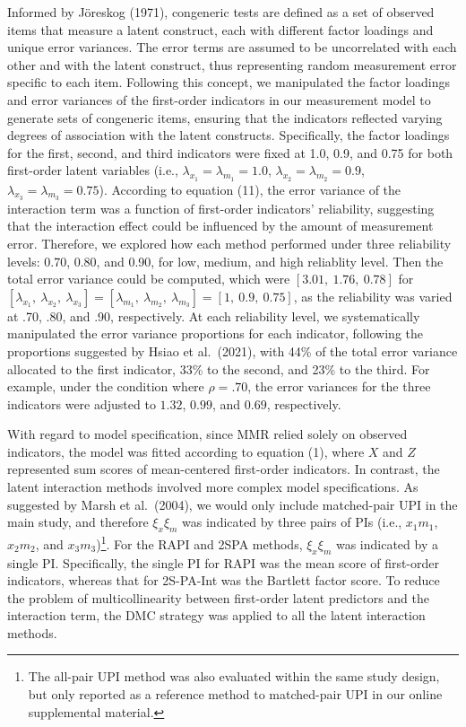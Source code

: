 \documentclass[
  man,mask]{apa6}
\begin{document}
Informed by Jöreskog (1971), congeneric tests are defined as a set of observed items that measure a latent construct, each with different factor loadings and unique error variances. The error terms are assumed to be uncorrelated with each other and with the latent construct, thus representing random measurement error specific to each item. Following this concept, we manipulated the factor loadings and error variances of the first-order indicators in our measurement model to generate sets of congeneric items, ensuring that the indicators reflected varying degrees of association with the latent constructs. Specifically, the factor loadings for the first, second, and third indicators were fixed at 1.0, 0.9, and 0.75 for both first-order latent variables (i.e., \(\lambda_{x_{1}} = \lambda_{m_{1}} = 1.0\), \(\lambda_{x_{2}} = \lambda_{m_{2}} = 0.9\), \(\lambda_{x_{3}} = \lambda_{m_{3}} = 0.75\)). According to equation (11), the error variance of the interaction term was a function of first-order indicators' reliability, suggesting that the interaction effect could be influenced by the amount of measurement error. Therefore, we explored how each method performed under three reliability levels: 0.70, 0.80, and 0.90, for low, medium, and high reliablity level. Then the total error variance could be computed, which were \([3.01, \ 1.76, \ 0.78]\) for \([\lambda_{x_{1}}, \ \lambda_{x_{2}}, \ \lambda_{x_{3}}] = [\lambda_{m_{1}}, \ \lambda_{m_{2}}, \ \lambda_{m_{3}}] = [1, \ 0.9, \ 0.75]\), as the reliability was varied at .70, .80, and .90, respectively. At each reliability level, we systematically manipulated the error variance proportions for each indicator, following the proportions suggested by Hsiao et al.~(2021), with 44\% of the total error variance allocated to the first indicator, 33\% to the second, and 23\% to the third. For example, under the condition where \(\rho = .70\), the error variances for the three indicators were adjusted to \(1.32\), \(0.99\), and \(0.69\), respectively.

With regard to model specification, since MMR relied solely on observed indicators, the model was fitted according to equation (1), where \(X\) and \(Z\) represented sum scores of mean-centered first-order indicators. In contrast, the latent interaction methods involved more complex model specifications. As suggested by Marsh et al.~(2004), we would only include matched-pair UPI in the main study, and therefore \(\xi_{x}\xi_{m}\) was indicated by three pairs of PIs (i.e., \(x_{1}m_{1}\), \(x_{2}m_{2}\), and \(x_{3}m_{3}\))\footnote{The all-pair UPI method was also evaluated within the same study design, but only reported as a reference method to matched-pair UPI in our online supplemental material.}. For the RAPI and 2SPA methods, \(\xi_{x}\xi_{m}\) was indicated by a single PI. Specifically, the single PI for RAPI was the mean score of first-order indicators, whereas that for 2S-PA-Int was the Bartlett factor score. To reduce the problem of multicollinearity between first-order latent predictors and the interaction term, the DMC strategy was applied to all the latent interaction methods.
\end{document}
